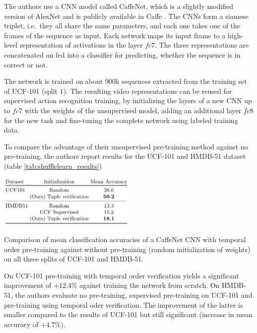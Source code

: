 The authors use a CNN model called CaffeNet, which is a slightly modified version of AlexNet \cite{krizhevsky_imagenet_2012-1} and is publicly available in Caffe \cite{jia_caffe:_2014}. 
The CNNs form a siamese triplet, i.e.\ they all share the same parameters, and each one takes one of the frames of the sequence as input.
Each network maps its input frame to a high-level representation of activations in the layer $fc7$.
The three representations are concatenated an fed into a classifier for predicting, whether the sequence is in correct or not.

The network is trained on about $900$k sequences extracted from the training set of UCF-101 (split 1).
The resulting video representations can be reused for supervised action recognition training, by initializing the layers of a new CNN up to $fc7$ with the weights of the unsupervised model, adding an additional layer $fc8$ for the new task and fine-tuning the complete network using labeled training data.

To compare the advantage of their unsupervised pre-training method against no pre-training, the authors report results for the UCF-101 and HMDB-51 dataset (table \ref{tab:shufflelearn_results})

\begin{table}[H]
    \centering
    \includegraphics[width=0.5\textwidth]{img_deep/shufflelearn_results}
    \caption{Comparison of mean classification accuracies of a CaffeNet CNN with temporal order pre-training against without pre-training (random initialization of weights) on all three splits of UCF-101 and HMDB-51. \cite{misra_shuffle_2016}}
    \label{tab:shufflelearn_results}
\end{table}

On UCF-101 pre-training with temporal order verification yields a significant improvement of $+12.4\%$ against training the network from scratch.
On HMDB-51, the authors evaluate no pre-training, supervised pre-training on UCF-101 and pre-training using temporal oder verification.
The improvement of the latter is smaller compared to the results of UCF-101 but still significant (increase in mean accuracy of $+4.7\%$).
